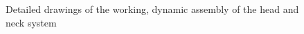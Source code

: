         \begin{figure}[H]
        \centering
        \qquad
        \caption[Detailed drawings of the working, dynamic assembly of the head and neck system]{Detailed drawings of the working, dynamic assembly of the head and neck system}
        \label{fig:mechDesign-headSubDetail}
        \end{figure}
        

